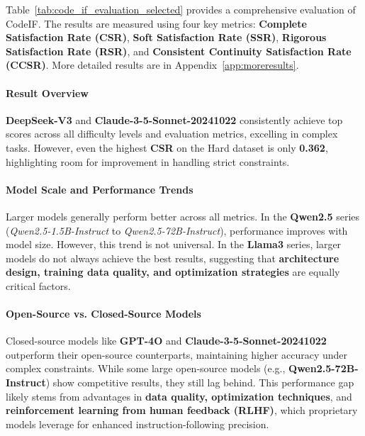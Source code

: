 Table~\ref{tab:code_if_evaluation_selected} provides a comprehensive evaluation of CodeIF. The results are measured using four key metrics: \textbf{Complete Satisfaction Rate (CSR)}, \textbf{Soft Satisfaction Rate (SSR)}, \textbf{Rigorous Satisfaction Rate (RSR)}, and \textbf{Consistent Continuity Satisfaction Rate (CCSR)}. More detailed results are in Appendix~\ref{app:moreresults}.

\paragraph{Result Overview} 
\textbf{DeepSeek-V3} and \textbf{Claude-3-5-Sonnet-20241022} consistently achieve top scores across all difficulty levels and evaluation metrics, excelling in complex tasks. However, even the highest \textbf{CSR} on the Hard dataset is only \textbf{0.362}, highlighting room for improvement in handling strict constraints.

\paragraph{Model Scale and Performance Trends} 
Larger models generally perform better across all metrics. In the \textbf{Qwen2.5} series (\textit{Qwen2.5-1.5B-Instruct} to \textit{Qwen2.5-72B-Instruct}), performance improves with model size. However, this trend is not universal. In the \textbf{Llama3} series, larger models do not always achieve the best results, suggesting that \textbf{architecture design, training data quality, and optimization strategies} are equally critical factors.

\paragraph{Open-Source vs. Closed-Source Models} 
Closed-source models like \textbf{GPT-4O} and \textbf{Claude-3-5-Sonnet-20241022} outperform their open-source counterparts, maintaining higher accuracy under complex constraints. While some large open-source models (e.g., \textbf{Qwen2.5-72B-Instruct}) show competitive results, they still lag behind. This performance gap likely stems from advantages in \textbf{data quality, optimization techniques}, and \textbf{reinforcement learning from human feedback (RLHF)}, which proprietary models leverage for enhanced instruction-following precision.



